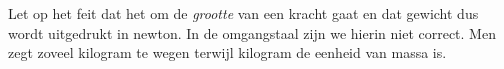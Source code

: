 \documentclass{ximera}
\begin{document}
	\author{Bart Lambregs}
    \xmsource




	
	
	
	Let op het feit dat het om de \textit{grootte} van een kracht gaat en dat gewicht dus wordt uitgedrukt in newton. In de omgangstaal zijn we hierin niet correct. Men zegt zoveel kilogram te wegen terwijl kilogram de eenheid van massa is.
	
	
	
	
\end{document}
